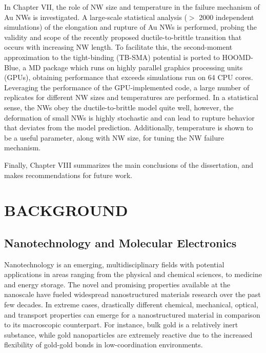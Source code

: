 \documentclass[10pt]{report}  %
\newcommand\findent{\hspace*{\parindent}}
\begin{document}
In Chapter VII, the role of NW size and temperature in the failure mechanism of Au NWs is investigated.\cite{French-gpus:2013} A large-scale statistical analysis ($>$ 2000 independent simulations) of the elongation and rupture of Au NWs is performed, probing the validity and scope of the recently proposed ductile-to-brittle transition that occurs with increasing NW length. \cite{Wu:2012} To facilitate this, the second-moment approximation to the tight-binding (TB-SMA)\cite{Cleri:1993}  potential is ported to HOOMD-Blue,\cite{Anderson:2008} a MD package which runs on highly parallel graphics processing units (GPUs), obtaining performance that exceeds simulations run on 64 CPU cores. Leveraging the performance of the GPU-implemented code, a large number of replicates for different NW sizes and temperatures are performed. In a statistical sense, the NWs obey the ductile-to-brittle model quite well, however, the deformation of small NWs is highly stochastic and can lead to rupture behavior that deviates from the model prediction. Additionally, temperature is shown to be a useful parameter, along with NW size, for tuning the NW failure mechanism.

Finally, Chapter VIII summarizes the main conclusions of the dissertation, and makes recommendations for future work.


%
%
%
%
%
%
\chapter{BACKGROUND}

\section{Nanotechnology and Molecular Electronics}

\findent Nanotechnology is an emerging, multidisciplinary fields with potential applications in areas ranging from the physical and chemical sciences,\cite{Nie:2010} to medicine \cite{Kumar:2010} and energy storage.\cite{Xu:2010}  The novel and promising properties available at the nanoscale have fueled widespread nanostructured materials research over the past few decades. In extreme cases, drastically different chemical, mechanical, optical, and transport properties can emerge for a nanostructured material in comparison to its macroscopic counterpart.\cite{Hodes:2007}  For instance, bulk gold is a relatively inert substance, while gold nanoparticles are extremely reactive due to the increased flexibility of gold-gold bonds in low-coordination environments.\cite{Rashkeev:2007}  
\end{document}
